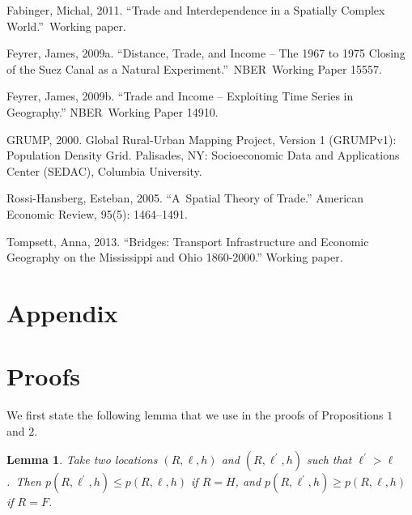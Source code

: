 \documentclass[12pt]{article}
\newtheorem{lemma}{Lemma}
\begin{document}
\begin{thebibliography}{99}
\bibitem{} Fabinger, Michal, 2011. \textquotedblleft Trade and
Interdependence in a Spatially Complex World.\textquotedblright \ Working
paper.

\bibitem{} Feyrer, James, 2009a. ``Distance, Trade, and Income -- The 1967 to
1975 Closing of the Suez Canal as a Natural Experiment.''\ NBER\ Working
Paper 15557.

\bibitem{} Feyrer, James, 2009b. ``Trade and Income -- Exploiting Time Series
in Geography.'' NBER\ Working Paper 14910.

\bibitem{} GRUMP, 2000. Global Rural-Urban Mapping Project, Version 1
(GRUMPv1): Population Density Grid. Palisades, NY: Socioeconomic Data and
Applications Center (SEDAC), Columbia University.

\bibitem{} Rossi-Hansberg, Esteban, 2005. ``A\ Spatial Theory of Trade.''
American Economic Review, 95(5): 1464--1491.

\bibitem{} Tompsett, Anna, 2013. ``Bridges: Transport Infrastructure and 
Economic Geography on the Mississippi and Ohio 1860-2000.'' Working paper.
\end{thebibliography}

\appendix
\section*{Appendix}%

\section{Proofs}

We first state the following lemma that we use in the proofs of Propositions 
$1$ and $2$.

\begin{lemma}
Take two locations $\left( R,\ell ,h\right) $ and $\left( R,\ell ^{\prime
},h\right) $ such that $\ell ^{\prime }>\ell $.\ Then $p\left( R,\ell
^{\prime },h\right) \leq p\left( R,\ell ,h\right) $ if $R=H$, and $p\left(
R,\ell ^{\prime },h\right) \geq p\left( R,\ell ,h\right) $ if $R=F$.
\end{lemma}
\end{document}
